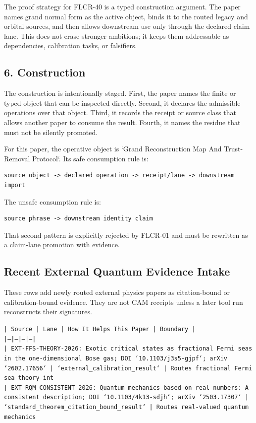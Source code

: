 \documentclass[11pt]{article}
\begin{document}
The proof strategy for FLCR-40 is a typed construction argument. The paper names grand normal form as the active object, binds it to the routed legacy and orbital sources, and then allows downstream use only through the declared claim lane. This does not erase stronger ambitions; it keeps them addressable as dependencies, calibration tasks, or falsifiers.

\subsection*{6. Construction}

The construction is intentionally staged. First, the paper names the finite or
typed object that can be inspected directly. Second, it declares the admissible
operations over that object. Third, it records the receipt or source class that
allows another paper to consume the result. Fourth, it names the residue that
must not be silently promoted.

For this paper, the operative object is `Grand Reconstruction Map And Trust-Removal Protocol`. Its safe consumption
rule is:

\begin{verbatim}
source object -> declared operation -> receipt/lane -> downstream import
\end{verbatim}

The unsafe consumption rule is:

\begin{verbatim}
source phrase -> downstream identity claim
\end{verbatim}

That second pattern is explicitly rejected by FLCR-01 and must be rewritten as
a claim-lane promotion with evidence.

\subsection*{Recent External Quantum Evidence Intake}

These rows add newly routed external physics papers as citation-bound or calibration-bound evidence. They are not CAM receipts unless a later tool run reconstructs their signatures.

\noindent\texttt{| Source | Lane | How It Helps This Paper | Boundary |}\\
\noindent\texttt{|---|---|---|---|}\\
\noindent\texttt{| EXT-FFS-THEORY-2026: Exotic critical states as fractional Fermi seas in the one-dimensional Bose gas; DOI `10.1103/j3s5-gjpf`; arXiv `2602.17656` | `external\_calibration\_result` | Routes fractional Fermi sea theory int}\\
\noindent\texttt{| EXT-RQM-CONSISTENT-2026: Quantum mechanics based on real numbers: A consistent description; DOI `10.1103/4k13-sdjh`; arXiv `2503.17307` | `standard\_theorem\_citation\_bound\_result` | Routes real-valued quantum mechanics }\\
\end{document}
